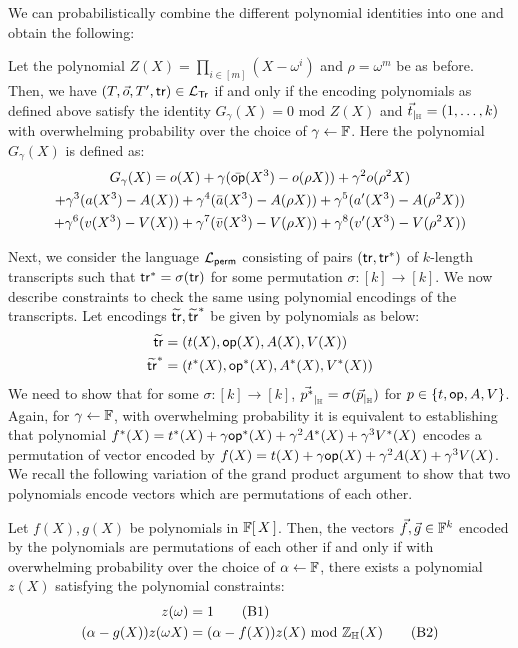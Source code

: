 We can probabilistically combine the different polynomial identities into one and obtain the following:
\begin{lemma}
    Let the polynomial $Z(X)=\prod_{i\in [m]}(X-\omega^i)$ and $\rho=\omega^m$ be as before.
    Then, we have $(T,\vec{o},T',\mathsf{tr})\in \mathcal{L}_{\mathsf{Tr}}$ if and only if the encoding polynomials as defined above satisfy
    the identity $G_\gamma(X) = 0  \text{ mod } Z(X)$ and $\vec{t}_{|_{\mathbb{H}}}=(1,\ldots,k)$ with overwhelming
    probability over the choice of $\gamma\gets \mathbb{F}$. Here the polynomial $G_\gamma(X)$ is defined as:
    \begin{multline*}
        G_\gamma(X) = o(X) + \gamma(\bar{\mathsf{op}}(X^3) - o(\rho X)) + \gamma^2 o(\rho^2 X) \\
        + \gamma^3(a(X^3) - A(X)) + \gamma^4(\bar{a}(X^3) - A(\rho X)) + \gamma^5(a'(X^3) - A(\rho^2 X)) \\
        + \gamma^6(v(X^3) - V(X)) + \gamma^7(\bar{v}(X^3) - V(\rho X)) + \gamma^8(v'(X^3) - V(\rho^2 X))
    \end{multline*}
\end{lemma}

Next, we consider the language $\mathcal{L}_{\mathsf{perm}}$ consisting of pairs $(\mathsf{tr}, \mathsf{tr}^\ast)$ of $k$-length transcripts such
that $\mathsf{tr}^\ast=\sigma(\mathsf{tr})$ for some permutation $\sigma:[k]\rightarrow [k]$. We now describe constraints
to check the same using polynomial encodings of the transcripts. Let encodings $\widetilde{\mathsf{tr}},\widetilde{\mathsf{tr}}^\ast$ be
given by polynomials as below:
\begin{align*}\label{eq:tr-encodings}
    \widetilde{\mathsf{tr}} &= (t(X),\mathsf{op}(X),A(X),V(X)) \\
    \widetilde{\mathsf{tr}}^\ast &= (t^\ast(X), \mathsf{op}^\ast(X), A^\ast(X), V^\ast(X))
\end{align*}
We need to show that for some $\sigma:[k]\rightarrow [k]$, $\vec{p^\ast}_{|_{\mathbb{H}}}=\sigma(\vec{p}_{|_{\mathbb{H}}})$ for $p\in \{t,\mathsf{op},A,V\}$.
Again, for $\gamma\gets \mathbb{F}$, with overwhelming probability it is equivalent to establishing that polynomial
$f^\ast(X)=t^\ast(X)+\gamma \mathsf{op}^\ast(X) + \gamma^2 A^\ast(X) + \gamma^3 V^\ast(X)$ encodes a permutation of
vector encoded by $f(X)=t(X)+\gamma \mathsf{op}(X) + \gamma^2 A(X) + \gamma^3 V(X)$. We recall the following variation
of the grand product argument to show that two polynomials encode vectors which are permutations of each other.

\begin{lemma}\label{lem:perm-argument}
    Let $f(X), g(X)$ be polynomials in $\mathbb{F}[\,X\,]$. Then, the vectors $\vec{f}, \vec{g}\in \mathbb{F}^k$ encoded by the polynomials
    are permutations of each other if and only if with overwhelming probability over the choice of $\alpha\gets \mathbb{F}$,
    there exists a polynomial $z(X)$ satisfying the polynomial constraints:
    \begin{align}\label{eq:perm-constraints}
        z(\omega) &= 1 \tag{B1} \label{eq:B1} \\
    (\alpha - g(X))z(\omega X) &= (\alpha - f(X))z(X) \text{ mod } \mathbb{Z}_{\mathbb{H}}(X) \tag{B2} \label{eq:B2}
    \end{align}
\end{lemma}


